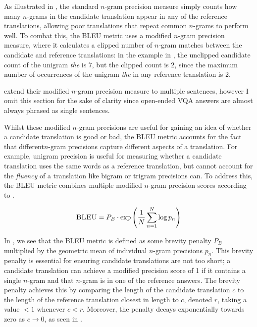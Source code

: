 As illustrated in \tableautorefname{ \ref{tab:bleu_ngraph_precision}}, the standard \(n\)-gram precision measure simply counts how many \(n\)-grams in the candidate translation appear in any of the reference translations, allowing poor translations that repeat common \(n\)-grams to perform well. To combat this, the BLEU metric uses a modified \(n\)-gram precision measure, where it calculates a clipped number of \(n\)-gram matches between the candidate and reference translations: in the example in \tableautorefname{ \ref{tab:bleu_ngraph_precision}}, the unclipped candidate count of the unigram \textit{the} is 7, but the clipped count is 2, since the maximum number of occurrences of the unigram \textit{the} in any reference translation is 2.

\cite{papineni2002bleu} extend their modified \(n\)-gram precision measure to multiple sentences, however I omit this section for the sake of clarity since open-ended VQA answers are almost always phrased as single sentences.

Whilst these modified \(n\)-gram precisions are useful for gaining an idea of whether a candidate translation is good or bad, the BLEU metric accounts for the fact that different\(n\)-gram precisions capture different aspects of a translation. For example, unigram precision is useful for measuring whether a candidate translation uses the same words as a reference translation, but cannot account for the \textit{fluency} of a translation like bigram or trigram precisions can. To address this, the BLEU metric combines multiple modified \(n\)-gram precision scores according to \equationautorefname{ \ref{equation:bleu_metric}}.

\begin{equation}
    \textsc{BLEU} = P_B \cdot \exp \left(\frac{1}{N} \sum_{n=1}^N \log p_n\right)
    \label{equation:bleu_metric}
\end{equation}

In \equationautorefname{ \ref{equation:bleu_metric}}, we see that the BLEU metric is defined as some brevity penalty \(P_B\) multiplied by the geometric mean of individual \(n\)-gram precisions \(p_n\). This brevity penalty is essential for ensuring candidate translations are not too short; a candidate translation can achieve a modified precision score of 1 if it contains a single \(n\)-gram and that \(n\)-gram is in one of the reference answers. The brevity penalty achieves this by comparing the length of the candidate translation \(c\) to the length of the reference translation closest in length to \(c\), denoted \(r\), taking a value \(< 1\) whenever \(c < r\). Moreover, the penalty decays exponentially towards zero as \(c \rightarrow 0\), as seen in \equationautorefname{ \ref{equation:bleu_brevity_penalty}}.

